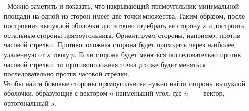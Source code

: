 \indent\indent\ Можно заметить и показать, что накрывающий
прямоугольник минимальной площади на одной из сторон
имеет две точки множества. Таким образом, после построения выпуклой оболочки
достаточно перебрать ее сторону $s$ и достроить остальные стороны
прямоугольника. Ориентируем стороны, например,
против часовой стрелки. Противоположная сторона будет проходить
через наиболее удаленную от $s$ точку $p$. Если сторона будет меняться
последовательно против часовой стрелки, то противоположная точка $p$ тоже
будет меняться последовательно против часовой стрелки.\\
Чтобы найти боковые стороны прямоугольника нужно найти стороны
выпуклой оболочки, образующие с вектором $n$ наименьший угол,
где $n$ ~--- вектор, ортогональный $s$.

